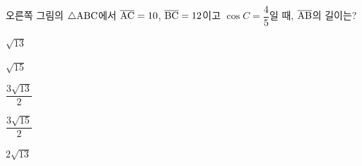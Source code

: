 \noindent\begin{minipage}[t]{0.58\linewidth}\vspace{0pt}\raggedright 오른쪽 그림의 $\triangle\mathrm{ABC}$에서 $\overline{\mathrm{AC}}=10$, $\overline{\mathrm{BC}}=12$이고 $\cos C=\dfrac{4}{5}$일 때, $\overline{\mathrm{AB}}$의 길이는?\end{minipage}\hfill\begin{minipage}[t]{0.4\linewidth}\vspace{0pt}\centering \resizebox{\ifdim\width>\linewidth\linewidth\else\width\fi}{!}{}\end{minipage}\par
\begin{choices32}{\rule[-3ex]{0pt}{8ex}$\sqrt{13}$}{\rule[-3ex]{0pt}{8ex}$\sqrt{15}$}{\rule[-3ex]{0pt}{8ex}$\dfrac{3\sqrt{13}}{2}$}{\rule[-3ex]{0pt}{8ex}$\dfrac{3\sqrt{15}}{2}$}{\rule[-3ex]{0pt}{8ex}$2\sqrt{13}$}\end{choices32}
